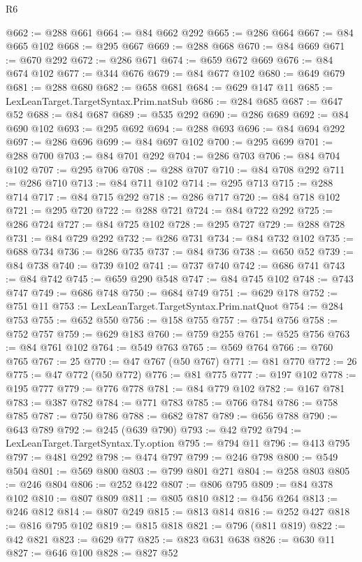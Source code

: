 \begin{lexlean}{R6}
\begin{coremodule}
@662 := @288 @661
@664 := @84 @662 @292
@665 := @286 @664
@667 := @84 @665 @102
@668 := @295 @667
@669 := @288 @668
@670 := @84 @669
@671 := @670 @292
@672 := @286 @671
@674 := @659 @672 @669
@676 := @84 @674 @102
@677 := @344 @676
@679 := @84 @677 @102
@680 := @649 @679
@681 := @288 @680
@682 := @658 @681
@684 := @629 @147 @11
@685 := LexLeanTarget.TargetSyntax.Prim.natSub
@686 := @284 @685
@687 := @647 @52
@688 := @84 @687
@689 := @535 @292
@690 := @286 @689
@692 := @84 @690 @102
@693 := @295 @692
@694 := @288 @693
@696 := @84 @694 @292
@697 := @286 @696
@699 := @84 @697 @102
@700 := @295 @699
@701 := @288 @700
@703 := @84 @701 @292
@704 := @286 @703
@706 := @84 @704 @102
@707 := @295 @706
@708 := @288 @707
@710 := @84 @708 @292
@711 := @286 @710
@713 := @84 @711 @102
@714 := @295 @713
@715 := @288 @714
@717 := @84 @715 @292
@718 := @286 @717
@720 := @84 @718 @102
@721 := @295 @720
@722 := @288 @721
@724 := @84 @722 @292
@725 := @286 @724
@727 := @84 @725 @102
@728 := @295 @727
@729 := @288 @728
@731 := @84 @729 @292
@732 := @286 @731
@734 := @84 @732 @102
@735 := @688 @734
@736 := @286 @735
@737 := @84 @736
@738 := @650 @52
@739 := @84 @738
@740 := @739 @102
@741 := @737 @740
@742 := @686 @741
@743 := @84 @742
@745 := @659 @290 @548
@747 := @84 @745 @102
@748 := @743 @747
@749 := @686 @748
@750 := @684 @749
@751 := @629 @178
@752 := @751 @11
@753 := LexLeanTarget.TargetSyntax.Prim.natQuot
@754 := @284 @753
@755 := @652 @550
@756 := @158 @755
@757 := @754 @756
@758 := @752 @757
@759 := @629 @183
@760 := @759 @255
@761 := @525 @756
@763 := @84 @761 @102
@764 := @549 @763
@765 := @569 @764
@766 := @760 @765
@767 := 25
@770 := @47 @767 (@50 @767)
@771 := @81 @770
@772 := 26
@775 := @47 @772 (@50 @772)
@776 := @81 @775
@777 := @197 @102
@778 := @195 @777
@779 := @776 @778
@781 := @84 @779 @102
@782 := @167 @781
@783 := @387 @782
@784 := @771 @783
@785 := @766 @784
@786 := @758 @785
@787 := @750 @786
@788 := @682 @787
@789 := @656 @788
@790 := @643 @789
@792 := @245 (@639 @790)
@793 := @42 @792
@794 := LexLeanTarget.TargetSyntax.Ty.option
@795 := @794 @11
@796 := @413 @795
@797 := @481 @292
@798 := @474 @797
@799 := @246 @798
@800 := @549 @504
@801 := @569 @800
@803 := @799 @801 @271
@804 := @258 @803
@805 := @246 @804
@806 := @252 @422
@807 := @806 @795
@809 := @84 @378 @102
@810 := @807 @809
@811 := @805 @810
@812 := @456 @264
@813 := @246 @812
@814 := @807 @249
@815 := @813 @814
@816 := @252 @427
@818 := @816 @795 @102
@819 := @815 @818
@821 := @796 (@811 @819)
@822 := @42 @821
@823 := @629 @77
@825 := @823 @631 @638
@826 := @630 @11
@827 := @646 @100
@828 := @827 @52

\end{coremodule}
\end{lexlean}
